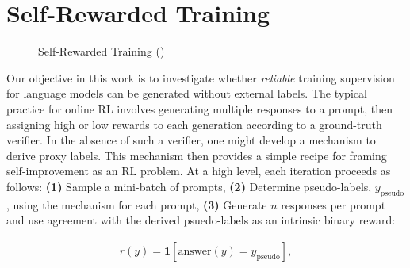 \section{Self-Rewarded Training}

\begin{figure}
\begin{minipage}{0.6\textwidth}
\begin{algorithm}[H]
\caption{Self-Rewarded Training (\algo{})}
\label{alg:srt}
\end{algorithm}
\end{minipage}
\vspace{-1em} 
\end{figure}

Our objective in this work is to investigate whether \emph{reliable} training supervision for language models can be generated without external labels. The typical practice for online RL involves generating multiple responses to a prompt, then assigning high or low rewards to each generation according to a ground-truth verifier. In the absence of such a verifier, one might develop a mechanism to derive proxy labels. This mechanism then provides a simple recipe for framing self-improvement as an RL problem. At a high level, each iteration proceeds as follows: \textbf{(1)} Sample a mini-batch of prompts, \textbf{(2)} Determine pseudo-labels, $y_\text{pseudo}$, using the mechanism for each prompt, \textbf{(3)}
Generate $n$ responses per prompt and use agreement with the derived psuedo-labels as an intrinsic binary reward:

\begin{align}
    \label{eqn:self-reward}
    r(y)=\mathbf{1}[\text{answer}(y)=y_\text{pseudo}],
\end{align}

